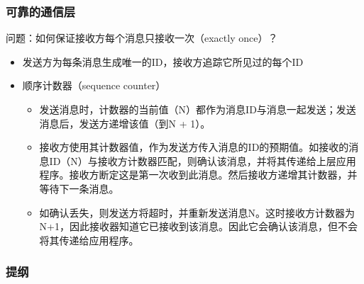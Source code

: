 \begin{frame}[fragile]
    \frametitle{可靠的通信层}
    问题：如何保证接收方每个消息只接收一次（exactly once）？\pause
    \begin{itemize}
        \item 发送方为每条消息生成唯一的ID，接收方追踪它所见过的每个ID
        \item  顺序计数器（sequence counter）
            \begin{itemize}
            \item 发送消息时，计数器的当前值（N）都作为消息ID与消息一起发送；发送消息后，发送方递增该值（到N + 1）。
            \item 接收方使用其计数器值，作为发送方传入消息的ID的预期值。如接收的消息ID（N）与接收方计数器匹配，则确认该消息，并将其传递给上层应用程序。接收方断定这是第一次收到此消息。然后接收方递增其计数器，并等待下一条消息。
            \item 如确认丢失，则发送方将超时，并重新发送消息N。这时接收方计数器为N+1，因此接收器知道它已接收到该消息。因此它会确认该消息，但不会将其传递给应用程序。
            \end{itemize}
    \end{itemize}
    
\end{frame}

\begin{frame}
    \frametitle{提纲} %
    \tableofcontents %
    
    
\end{frame}
